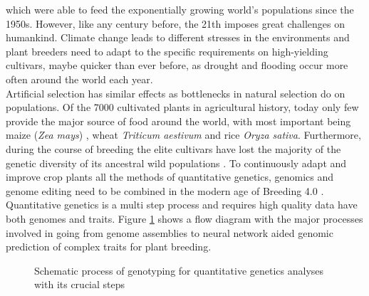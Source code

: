 which were able to feed the exponentially growing world's populations since the
1950s. However, like any century before, the 21th imposes great challenges on
humankind. Climate change leads to different stresses in the environments and plant
breeders need to adapt to the specific requirements on high-yielding cultivars, maybe
quicker than ever before, as drought and flooding occur more often around the world each
year. \\
Artificial selection has similar effects as bottlenecks in natural selection do on
populations. Of the 7000 cultivated plants in agricultural history, today only few provide
the major source of food around the world, with most important being maize (\textit{Zea
  mays}) , wheat \textit{Triticum aestivum} and rice \textit{Oryza sativa}.  Furthermore,
during the course of breeding the elite cultivars have lost the majority of the genetic
diversity of its ancestral wild populations \cite{walsh2018}. To continuously adapt and
improve crop plants all the methods of quantitative genetics, genomics and genome editing
need to be combined in the modern age of Breeding 4.0 \cite{wallace2018road}. \\
Quantitative genetics is a multi step process and requires high quality data have both
genomes and traits. Figure \ref{fig:quan_flow1} shows a flow diagram with the major
processes involved in going from genome assemblies to neural network aided genomic
prediction of complex traits for plant breeding.



\begin{figure}[H]
  \begin{center}
    \caption[Schematic process of genotyping for quantitative genetics]{Schematic process of genotyping for quantitative genetics analyses with its crucial steps} \label{fig:quan_flow1}
  \end{center}     
\end{figure}


